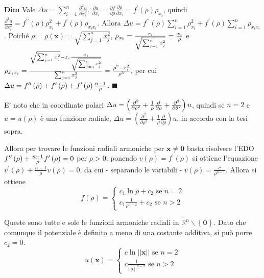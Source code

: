 \documentclass{article}
\begin{document}
\textbf{Dim} Vale $\Delta u=\sum_{i=1}^{n}\frac{\partial ^{2}u}{\partial
x_{i}^{2}}$. $\frac{\partial u}{\partial x_{i}}=\frac{\partial f}{\partial
\rho }\frac{\partial \rho }{\partial x_{i}}=f^{\prime }\left( \rho \right)
\rho _{x_{i}}$, quindi $\frac{\partial ^{2}u}{\partial x_{i}^{2}}=f^{\prime
\prime }\left( \rho \right) \rho _{x_{i}}^{2}+f^{\prime }\left( \rho \right)
\rho _{x_{i}x_{i}}$. Allora $\Delta u=f^{\prime \prime }\left( \rho \right)
\sum_{i=1}^{n}\rho _{x_{i}}^{2}+f^{\prime }\left( \rho \right)
\sum_{i=1}^{n}\rho _{x_{i}x_{i}}$. Poich\'{e} $\rho =\rho \left( \mathbf{x}%
\right) =\sqrt{\sum_{j=1}^{n}x_{j}^{2}}$, $\rho _{x_{i}}=\frac{x_{i}}{\sqrt{%
\sum_{j=1}^{n}x_{j}^{2}}}=\frac{x_{i}}{\rho }$ e $\rho _{x_{i}x_{i}}=\frac{%
\sqrt{\sum_{j=1}^{n}x_{j}^{2}}-x_{i}\frac{x_{i}}{\sqrt{%
\sum_{j=1}^{n}x_{j}^{2}}}}{\sum_{j=1}^{n}x_{j}^{2}}=\frac{\rho ^{2}-x_{i}^{2}%
}{\rho ^{3}}$, per cui $\Delta u=f^{\prime \prime }\left( \rho \right)
+f^{\prime }\left( \rho \right) +f^{\prime }\left( \rho \right) \frac{n-1}{%
\rho }$. $\blacksquare $

E' noto che in coordinate polari $\Delta u=\left( \frac{\partial ^{2}}{%
\partial \rho ^{2}}+\frac{1}{\rho }\frac{\partial }{\partial \rho }+\frac{%
\partial ^{2}}{\partial \theta ^{2}}\right) u$, quindi se $n=2$ e $u=u\left(
\rho \right) $ \`{e} una funzione radiale, $\Delta u=\left( \frac{\partial
^{2}}{\partial \rho ^{2}}+\frac{1}{\rho }\frac{\partial }{\partial \rho }%
\right) u$, in accordo con la tesi sopra.

Allora per trovare le funzioni radiali armoniche per $\mathbf{x\neq 0}$
basta risolvere l'EDO $f^{\prime \prime }\left( \rho \right) +\frac{n-1}{%
\rho }f^{\prime }\left( \rho \right) =0$ per $\rho >0$: ponendo $v\left(
\rho \right) =f^{\prime }\left( \rho \right) $ si ottiene l'equazione $%
v^{\prime }\left( \rho \right) +\frac{n-1}{\rho }v\left( \rho \right) =0$,
da cui - separando le variabili - $v\left( \rho \right) =\frac{c}{\rho ^{n-1}%
}$. Allora si ottiene%
\begin{equation*}
f\left( \rho \right) =\left\{ 
\begin{array}{c}
c_{1}\ln \rho +c_{2}\text{ se }n=2 \\ 
c_{1}\frac{1}{\rho ^{n-2}}+c_{2}\text{ se }n>2%
\end{array}%
\right.
\end{equation*}

Queste sono tutte e sole le funzioni armoniche radiali in $%
\mathbb{R}
^{n}\backslash \left\{ \mathbf{0}\right\} $. Dato che comunque il potenziale 
\`{e} definito a meno di una costante additiva, si pu\`{o} porre $c_{2}=0$. 
\begin{equation*}
u\left( \mathbf{x}\right) =\left\{ 
\begin{array}{c}
c\ln \left\vert \left\vert \mathbf{x}\right\vert \right\vert \text{ se }n=2
\\ 
c\frac{1}{\left\vert \left\vert \mathbf{x}\right\vert \right\vert ^{n-2}}%
\text{ se }n>2%
\end{array}%
\right.
\end{equation*}
\end{document}
